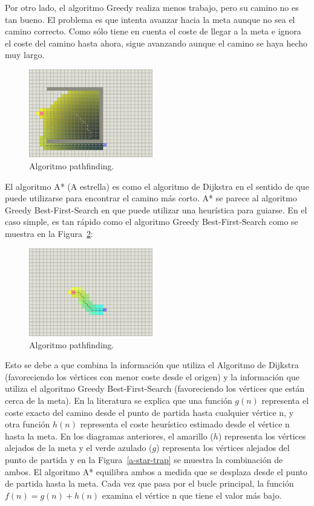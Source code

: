 \documentclass[reprint,amsmath,amssymb,aps]{revtex4-2}
\begin{document}
Por otro lado, el algoritmo Greedy realiza menos trabajo, pero su camino no es tan bueno. El problema es que intenta avanzar hacia la meta aunque no sea el camino correcto. Como sólo tiene en cuenta el coste de llegar a la meta e ignora el coste del camino hasta ahora, sigue avanzando aunque el camino se haya hecho muy largo.
 
\begin{figure}[H]
 	\centering
 	\includegraphics[width=0.48\textwidth]{greedy-trap.png}
 	\caption{Algoritmo pathfinding.}
 	\label{a-trap}
\end{figure}


El algoritmo A* (A estrella) es como el algoritmo de Dijkstra en el sentido de que puede utilizarse para encontrar el camino más corto. A* se parece al algoritmo Greedy Best-First-Search en que puede utilizar una heurística para guiarse. En el caso simple, es tan rápido como el algoritmo Greedy Best-First-Search como se muestra en la Figura~\ref{a-star}:

\begin{figure}[H]
	\centering
	\includegraphics[width=0.48\textwidth]{a-star.png}
	\caption{Algoritmo pathfinding.}
	\label{a-star}
\end{figure}

Esto se debe a que combina la información que utiliza el Algoritmo de Dijkstra (favoreciendo los vértices con menor coste desde el origen) y la información que utiliza el algoritmo Greedy Best-First-Search (favoreciendo los vértices que están cerca de la meta). En la literatura se explica que una función $g(n)$ representa el coste exacto del camino desde el punto de partida hasta cualquier vértice n, y otra función $h(n)$ representa el coste heurístico estimado desde el vértice n hasta la meta. En los diagramas anteriores, el amarillo ($h$) representa los vértices alejados de la meta y el verde azulado ($g$) representa los vértices alejados del punto de partida y en la Figura~\ref{a-star-trap} se muestra la combinación de ambos. El algoritmo A* equilibra ambos a medida que se desplaza desde el punto de partida hasta la meta. Cada vez que pasa por el bucle principal, la función $f(n)=g(n)+h(n)$ examina el vértice n que tiene el valor más bajo.
\end{document}
